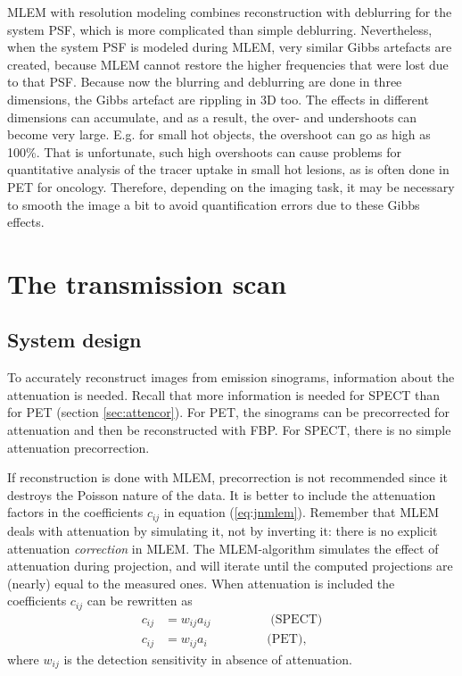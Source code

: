 \documentclass[11pt,oneside]{book}
\begin{document}
MLEM with resolution modeling combines reconstruction with deblurring
for the system PSF, which is more complicated than simple
deblurring. Nevertheless, when the system PSF is modeled during MLEM,
very similar Gibbs artefacts are created, because MLEM cannot restore
the higher frequencies that were lost due to that PSF. Because now the
blurring and deblurring are done in three dimensions, the Gibbs
artefact are rippling in 3D too. The effects in different dimensions
can accumulate, and as a result, the over- and undershoots can become
very large. E.g. for small hot objects, the overshoot can go as high
as 100\%. That is unfortunate, such high overshoots can cause problems
for quantitative analysis of the tracer uptake in small hot lesions,
as is often done in PET for oncology. Therefore, depending on the
imaging task, it may be necessary to smooth the image a bit to avoid
quantification errors due to these Gibbs effects.

\chapter{The transmission scan} \label{ch:trans}


\section{System design}
To accurately reconstruct images from emission sinograms, information about
the attenuation is needed. Recall that more information is needed for SPECT
than for PET (section \ref{sec:attencor}). For PET, the
sinograms can be precorrected for attenuation and then be reconstructed with
FBP. For SPECT, there is no simple attenuation precorrection.

If reconstruction is done with MLEM, precorrection is not recommended since it
destroys the Poisson nature of the data. It is better to include the
attenuation factors in the coefficients $c_{ij}$ in equation
(\ref{eq:jnmlem}). Remember that MLEM deals with attenuation by simulating it,
not by inverting it: there is no explicit attenuation {\em correction} in
MLEM. The MLEM-algorithm simulates the effect of attenuation during
projection, and will iterate until the computed projections are (nearly) equal
to the measured ones. When attenuation is included the coefficients $c_{ij}$
can be rewritten as
\begin{align}
  c_{ij} &= w_{ij} a_{ij} \hspace{2cm} \mbox{(SPECT)}\\
  c_{ij} &= w_{ij} a_{i}  \hspace{2cm} \mbox{(PET)},
\end{align}
where $w_{ij}$ is the detection sensitivity in absence of attenuation.
\end{document}
